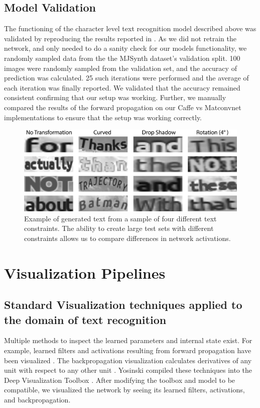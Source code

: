 \documentclass[10pt,twocolumn,letterpaper]{article}
\begin{document}
\subsection{Model Validation} \label{sec:modelval}
The functioning of the character level text recognition model described above was validated by reproducing the results reported in \cite{Jaderberg14c}. As we did not retrain the network, and only needed to do a sanity check for our models functionality, we randomly sampled data from the the MJSynth dataset's validation split. 100 images were randomly sampled from the validation set, and the accuracy of prediction was calculated. 25 such iterations were performed and the average of each iteration was finally reported. We validated that the accuracy remained consistent confirming that our setup was working. Further, we manually compared the results of the forward propagation on our Caffe vs Matconvnet implementations to ensure that the setup was working correctly.


\begin{figure}
\includegraphics[width=\columnwidth]{Figures/synthtext_outputs/synthext_outputs.png}
\caption{Example of generated text from a sample of four different text constraints. The ability to create large test sets with different constraints allows us to compare differences in network activations.}
\label{fig:genText}
\end{figure}


\section{Visualization Pipelines}


\subsection{Standard Visualization techniques applied to the domain of text recognition}
Multiple methods to inspect the learned parameters and internal state exist. For example, learned filters and activations resulting from forward propagation have been visualized \cite{yosinski2015understanding}. The backpropagation visualization calculates derivatives of any unit with respect to any other unit \cite{DBLP:journals/corr/ZeilerF13}. Yosinski compiled these techniques into the Deep Visualization Toolbox \cite{yosinski2015understanding}. After modifying the toolbox and model to be compatible, we visualized the network by seeing its learned filters, activations, and backpropagation.
\end{document}

